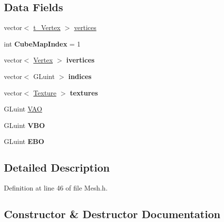 \subsection*{Data Fields}
\begin{DoxyCompactItemize}
\item 
vector$<$ \hyperlink{structt___vertex}{t\+\_\+\+Vertex} $>$ \hyperlink{class_mesh_ae065969fc6d4864eca63f57d14030a5d}{vertices}
\item 
int {\bfseries Cube\+Map\+Index} = 1\hypertarget{class_mesh_a44fcd4d07b93cb0a57c7fa0d6ff8a8ba}{}\label{class_mesh_a44fcd4d07b93cb0a57c7fa0d6ff8a8ba}

\item 
vector$<$ \hyperlink{struct_vertex}{Vertex} $>$ {\bfseries ivertices}\hypertarget{class_mesh_a5853c81e7f7a948a75ca43d3e8747310}{}\label{class_mesh_a5853c81e7f7a948a75ca43d3e8747310}

\item 
vector$<$ G\+Luint $>$ {\bfseries indices}\hypertarget{class_mesh_a233e40975b5ddafda502c8c31b77db2c}{}\label{class_mesh_a233e40975b5ddafda502c8c31b77db2c}

\item 
vector$<$ \hyperlink{struct_texture}{Texture} $>$ {\bfseries textures}\hypertarget{class_mesh_a09bf4e8307bf7717c56501ca6293c6c0}{}\label{class_mesh_a09bf4e8307bf7717c56501ca6293c6c0}

\item 
G\+Luint \hyperlink{class_mesh_a09b989b9d4df8ae595d7e80e091a4a5b}{V\+AO}
\item 
G\+Luint {\bfseries V\+BO}\hypertarget{class_mesh_a0d28b2c6fee628a13f43cae3f858569b}{}\label{class_mesh_a0d28b2c6fee628a13f43cae3f858569b}

\item 
G\+Luint {\bfseries E\+BO}\hypertarget{class_mesh_a894c6723c0172f4e38b2509582abfa6c}{}\label{class_mesh_a894c6723c0172f4e38b2509582abfa6c}

\end{DoxyCompactItemize}


\subsection{Detailed Description}


Definition at line 46 of file Mesh.\+h.



\subsection{Constructor \& Destructor Documentation}
